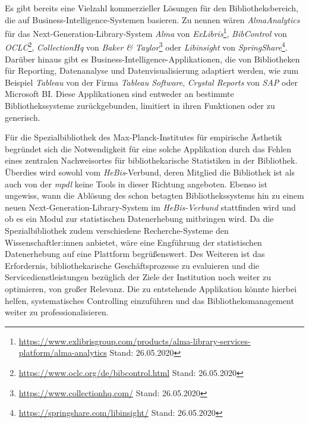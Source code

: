 Es gibt bereits eine Vielzahl kommerzieller Lösungen für den Bibliotheksbereich, die auf Business-Intelligence-Systemen basieren.
Zu nennen wären \textit{AlmaAnalytics} für das Next-Generation-Library-System \textit{Alma} von \textit{ExLibris}\footnote{\url{https://www.exlibrisgroup.com/products/alma-library-services-platform/alma-analytics}
Stand: 26.05.2020}, \textit{BibControl} von \textit{OCLC}\footnote{\url{https://www.oclc.org/de/bibcontrol.html} Stand: 26.05.2020},
\textit{CollectionHq} von \textit{Baker \& Taylor}\footnote{\url{https://www.collectionhq.com/} Stand: 26.05.2020} oder \textit{Libinsight} von \textit{SpringShare}\footnote{\url{https://springshare.com/libinsight/} Stand: 26.05.2020}.
Darüber hinaus gibt es Business-Intelligence-Applikationen, die von Bibliotheken für Reporting, Datenanalyse und Datenvisualisierung adaptiert werden,
wie zum Beispiel \textit{Tableau} von der Firma \textit{Tableau Software},
\textit{Crystal Reports} von \textit{SAP} oder Microsoft BI.
Diese Applikationen sind entweder an bestimmte Bibliothekssysteme zurückgebunden, limitiert in ihren
Funktionen\cite{golas_statistische_2018} oder zu generisch.

Für die Spezialbibliothek des Max-Planck-Institutes für empirische Ästhetik begründet sich die Notwendigkeit für eine solche Applikation durch das
Fehlen eines zentralen Nachweisortes für bibliothekarische
Statistiken in der Bibliothek. Überdies wird sowohl vom \textit{HeBis}-Verbund, deren Mitglied die Bibliothek ist als auch von der \textit{mpdl} keine Tools in dieser Richtung angeboten. Ebenso ist ungewiss, wann die Ablösung des schon betagten Bibliothekssystems hin zu
einem neuen Next-Generation-Library-System im \textit{HeBis-Verbund} stattfinden wird und ob
es ein Modul zur statistischen Datenerhebung mitbringen wird. Da die Spezialbibliothek zudem verschiedene Recherche-Systeme den Wissenschaftler:innen anbietet, wäre eine Engführung der statistischen Datenerhebung auf eine Plattform begrüßenswert.
Des Weiteren ist das Erfordernis, bibliothekarische Geschäftsprozesse zu evaluieren und die
Servicedienstleistungen bezüglich der Ziele der Institution noch weiter zu
optimieren, von großer Relevanz. 
Die zu entstehende Applikation könnte hierbei helfen, systematisches Controlling einzuführen und das
Bibliotheksmanagement weiter zu professionalisieren.


